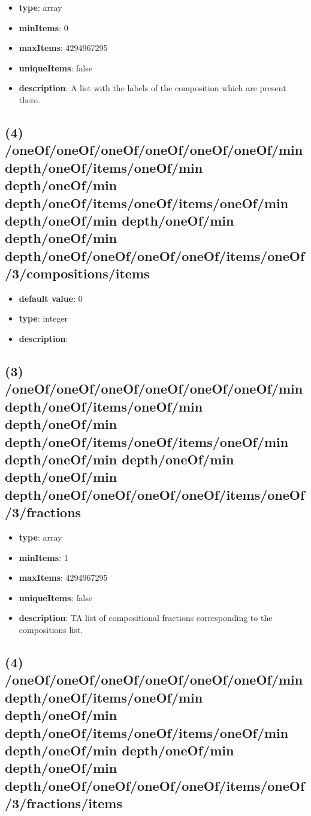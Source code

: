 \begin{itemize}[leftmargin=3em]\item {\bf type}: array
\item {\bf minItems}: 0
\item {\bf maxItems}: 4294967295
\item {\bf uniqueItems}: false
\item {\bf description}: A list with the labels of the composition which are present there.
\end{itemize}\subsection{(4) /oneOf/oneOf/oneOf/oneOf/oneOf/oneOf/min depth/oneOf/items/oneOf/min depth/oneOf/min depth/oneOf/items/oneOf/items/oneOf/min depth/oneOf/min depth/oneOf/min depth/oneOf/min depth/oneOf/oneOf/oneOf/oneOf/items/oneOf/3/compositions/items}
\begin{itemize}[leftmargin=4em]\item {\bf default value}: 0
\item {\bf type}: integer
\item {\bf description}: 
\end{itemize}\subsection{(3) /oneOf/oneOf/oneOf/oneOf/oneOf/oneOf/min depth/oneOf/items/oneOf/min depth/oneOf/min depth/oneOf/items/oneOf/items/oneOf/min depth/oneOf/min depth/oneOf/min depth/oneOf/min depth/oneOf/oneOf/oneOf/oneOf/items/oneOf/3/fractions}
\begin{itemize}[leftmargin=3em]\item {\bf type}: array
\item {\bf minItems}: 1
\item {\bf maxItems}: 4294967295
\item {\bf uniqueItems}: false
\item {\bf description}: TA list of compositional fractions corresponding to the compositions list.
\end{itemize}\subsection{(4) /oneOf/oneOf/oneOf/oneOf/oneOf/oneOf/min depth/oneOf/items/oneOf/min depth/oneOf/min depth/oneOf/items/oneOf/items/oneOf/min depth/oneOf/min depth/oneOf/min depth/oneOf/min depth/oneOf/oneOf/oneOf/oneOf/items/oneOf/3/fractions/items}
